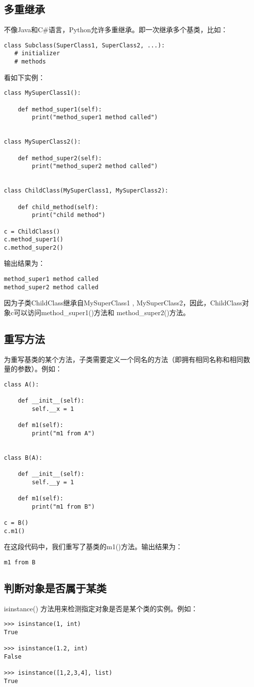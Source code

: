 \subsection{多重继承}
不像Java和C\#语言，Python允许多重继承。即一次继承多个基类，比如：

\begin{lstlisting}
class Subclass(SuperClass1, SuperClass2, ...):
   # initializer
   # methods
\end{lstlisting}

看如下实例：

\begin{lstlisting}
class MySuperClass1():

    def method_super1(self):
        print("method_super1 method called")


class MySuperClass2():

    def method_super2(self):
        print("method_super2 method called")


class ChildClass(MySuperClass1, MySuperClass2):

    def child_method(self):
        print("child method")

c = ChildClass()
c.method_super1()
c.method_super2()

\end{lstlisting}

输出结果为：

\begin{lstlisting}
method_super1 method called
method_super2 method called
\end{lstlisting}

因为子类ChildClass继承自MySuperClass1 , MySuperClass2，因此，ChildClass对象c可以访问method\_super1()方法和 method\_super2()方法。

\subsection{重写方法}
为重写基类的某个方法，子类需要定义一个同名的方法（即拥有相同名称和相同数量的参数）。例如：

\begin{lstlisting}
class A():

    def __init__(self):
        self.__x = 1

    def m1(self):
        print("m1 from A")


class B(A):

    def __init__(self):
        self.__y = 1

    def m1(self):
        print("m1 from B")

c = B()
c.m1()
\end{lstlisting}
在这段代码中，我们重写了基类的m1()方法。输出结果为：

\begin{lstlisting}
m1 from B
\end{lstlisting}

\subsection{判断对象是否属于某类}

isinstance() 方法用来检测指定对象是否是某个类的实例。例如：

\begin{lstlisting}
>>> isinstance(1, int)
True

>>> isinstance(1.2, int)
False

>>> isinstance([1,2,3,4], list)
True
\end{lstlisting}
